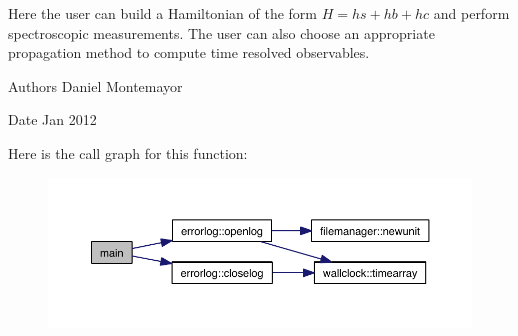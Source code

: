 Here the user can build a Hamiltonian of the form $H=hs+hb+hc$ and perform spectroscopic measurements. The user can also choose an appropriate propagation method to compute time resolved observables. \begin{DoxyAuthor}{Authors}
Daniel Montemayor
\end{DoxyAuthor}
\begin{DoxyDate}{Date}
Jan 2012 
\end{DoxyDate}
Here is the call graph for this function\+:\nopagebreak
\begin{figure}[H]
\begin{center}
\leavevmode
\includegraphics[width=350pt]{share_2examples_2_morse_oscillator_2system__driver_8f90_a8ec2266d83cd6c0b762cbcbc92c0af3d_cgraph}
\end{center}
\end{figure}
